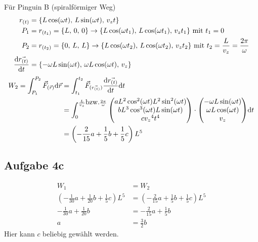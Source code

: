 \documentclass[a4paper,10pt]{extarticle}
\begin{document}
Für Pinguin B (spiralförmiger Weg)
\begin{align*}
r_{(t)} &= \{L\cos(\omega t) , \, L\sin(\omega t) ,\, v_zt \} \\
P_1 &= r_{(t_1)} = \{L , \, 0 , \, 0 \} \rightarrow \{L\cos(\omega t_1),\, L\cos(\omega t_1),\, v_zt_1 \} \,\, \mbox{mit} \,\, t_1 = 0 \\
P_2 &= r_{(t_2)} = \{0 , \, L , \, L \} \rightarrow \{L\cos(\omega t_2),\, L\cos(\omega t_2),\, v_zt_2 \} \,\, \mbox{mit} \,\, t_2 = \frac{L}{v_z} = \frac{2 \pi}{\omega} \\
\dv{\vec{r_{(t)}}}{t} &= \{- \omega L\sin(\omega t) ,\, \omega L\cos(\omega t) ,\, v_z \} \\
\end{align*}
\begin{align*}
W_2 = \int_{P_1}^{P_2} \vec{F}_{(\vec{r})} \dd \vec{r} &= \int_{t_1}^{t_2} \vec{F}_{( \vec{ r_{(t)} } )} \dv{\vec{r_{(t)}}}{t} \dd t \\
&= \int_0^{\frac{L}{v_z} \mbox{bzw.} \frac{2 \pi}{\omega}} \mqty(a L^2 \cos^2(\omega t) L^2 \sin^2(\omega t) \\ b L^3 \cos^3(\omega t) L \sin(\omega t) \\ c {v_z}^4 t^4) \cdot \mqty(- \omega L\sin(\omega t) \\ \omega L\cos(\omega t) \\ v_z) \dd t \\
&= \left(-\frac{2}{15}a + \frac{1}{5}b + \frac{1}{5}c\right)L^5
\end{align*}

\subsection*{Aufgabe 4c}
\begin{align*}
W_1 &= W_2 \\
\left(-\frac{1}{30}a + \frac{1}{20}b + \frac{1}{5}c\right)L^5 &= \left(-\frac{2}{15}a + \frac{1}{5}b + \frac{1}{5}c\right)L^5 \\ 
- \frac{1}{30}a + \frac{1}{20}b &= - \frac{2}{15}a + \frac{1}{5}b \\
a &= \frac{3}{2}b
\end{align*}
Hier kann $c$ beliebig gewählt werden.
\end{document}
